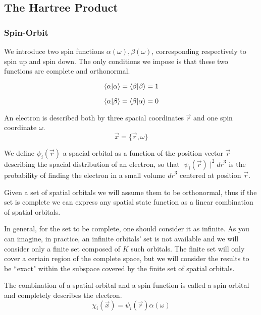 \documentclass[a4paper,12pt]{article}
\begin{document}
\subsection{The Hartree Product}
\subsubsection{Spin-Orbit}
We introduce two spin functions  $\alpha(\omega), \beta(\omega)$, corresponding respectively to spin up and spin down.
The only conditions we impose is that these two functions are complete and orthonormal.

\begin{equation}
	\bra{\alpha}\ket{\alpha} = \bra{\beta}\ket{\beta} = 1
\end{equation}

\begin{equation}
	\bra{\alpha}\ket{\beta} = \bra{\beta}\ket{\alpha} = 0
\end{equation}

An electron is described both by three spacial coordinates $\vec{r}$ and one spin coordinate $\omega$.
\begin{equation}
	\vec{x} = \{\vec{r},\omega\}
\end{equation}

We define $\psi_i(\vec{r})$ a spacial orbital as a function of the position vector $\vec{r}$ describing the spacial distribution of an electron, so that $\mid\psi_i(\vec{r})\mid^2 {dr}^3$ is the probability of finding the electron in a small volume ${dr}^3$ centered at position $\vec{r}$.

Given a set of spatial orbitals we will assume them to be orthonormal, thus if the set is complete we can express any spatial state function as a linear combination of spatial orbitals.

In general, for the set to be complete, one should consider it as infinite. As you can imagine, in practice, an infinite orbitals' set is not available and we will consider only a finite set composed of $K$ such orbitals. The finite set will only cover a certain region of the complete space, but we will consider the results to be ``exact" within the subspace covered by the finite set of spatial orbitals.

The combination of a spatial orbital and a spin function is called a spin orbital and completely describes the electron. 
\begin{equation}
	\chi_{i}(\vec{x}) = \psi_i(\vec{r}) \alpha(\omega)
\end{equation}
\end{document}
